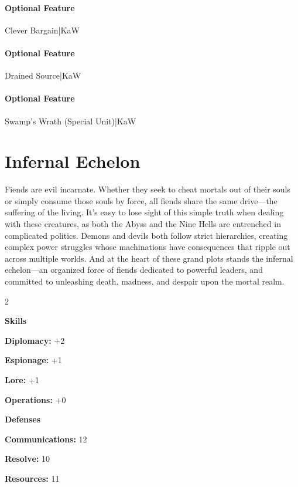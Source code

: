 \documentclass[10pt,a4paper,twoside,bg=print,twocolumn,openany,nodeprecatedcode]{dndbook}
\begin{document}
\paragraph{Optional Feature}
Clever Bargain|KaW

\paragraph{Optional Feature}
Drained Source|KaW

\paragraph{Optional Feature}
Swamp's Wrath (Special Unit)|KaW

\section{Infernal Echelon}
Fiends are evil incarnate. Whether they seek to cheat mortals out of their souls or simply consume those souls by force, all fiends share the same drive—the suffering of the living. It's easy to lose sight of this simple truth when dealing with these creatures, as both the Abyss and the Nine Hells are entrenched in complicated politics. Demons and devils both follow strict hierarchies, creating complex power struggles whose machinations have consequences that ripple out across multiple worlds. And at the heart of these grand plots stands the infernal echelon—an organized force of fiends dedicated to powerful leaders, and committed to unleashing death, madness, and despair upon the mortal realm.


\begin{itemize}
\begin{multicols}{2}
\item \textbf{Skills}
\item \textbf{Diplomacy:} +2
\item \textbf{Espionage:} +1
\item \textbf{Lore:} +1
\item \textbf{Operations:} +0
\item \textbf{Defenses}
\item \textbf{Communications:} 12
\item \textbf{Resolve:} 10
\item \textbf{Resources:} 11
\end{multicols}

\end{itemize}
\end{document}
